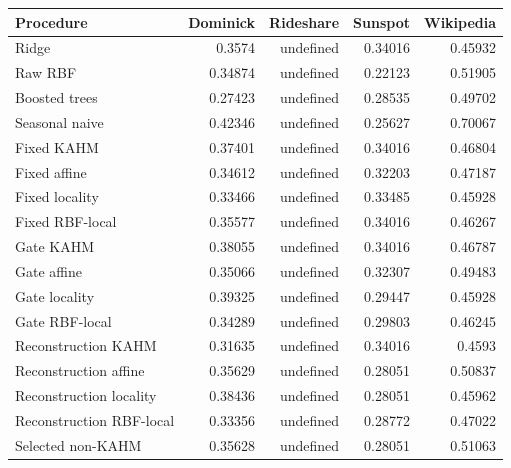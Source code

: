 \begin{tabular}{lrrrr}
\toprule
Procedure & Dominick & Rideshare & Sunspot & Wikipedia \\
\midrule
Ridge & 0.3574 & undefined & 0.34016 & 0.45932 \\
Raw RBF & 0.34874 & undefined & 0.22123 & 0.51905 \\
Boosted trees & 0.27423 & undefined & 0.28535 & 0.49702 \\
Seasonal naive & 0.42346 & undefined & 0.25627 & 0.70067 \\
Fixed KAHM & 0.37401 & undefined & 0.34016 & 0.46804 \\
Fixed affine & 0.34612 & undefined & 0.32203 & 0.47187 \\
Fixed locality & 0.33466 & undefined & 0.33485 & 0.45928 \\
Fixed RBF-local & 0.35577 & undefined & 0.34016 & 0.46267 \\
Gate KAHM & 0.38055 & undefined & 0.34016 & 0.46787 \\
Gate affine & 0.35066 & undefined & 0.32307 & 0.49483 \\
Gate locality & 0.39325 & undefined & 0.29447 & 0.45928 \\
Gate RBF-local & 0.34289 & undefined & 0.29803 & 0.46245 \\
Reconstruction KAHM & 0.31635 & undefined & 0.34016 & 0.4593 \\
Reconstruction affine & 0.35629 & undefined & 0.28051 & 0.50837 \\
Reconstruction locality & 0.38436 & undefined & 0.28051 & 0.45962 \\
Reconstruction RBF-local & 0.33356 & undefined & 0.28772 & 0.47022 \\
Selected non-KAHM & 0.35628 & undefined & 0.28051 & 0.51063 \\
\bottomrule
\end{tabular}
